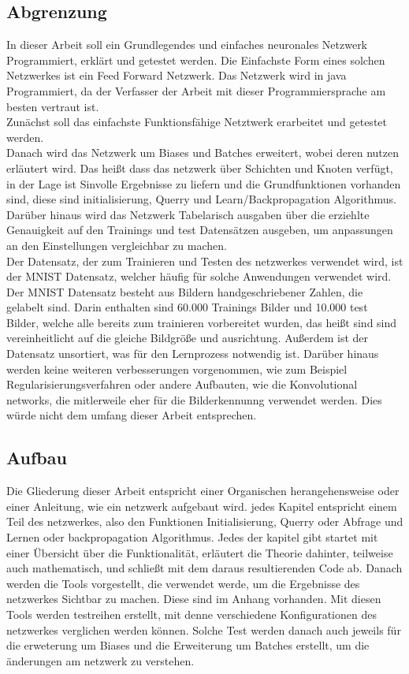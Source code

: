 \documentclass[12pt]{article}
\begin{document}
\subsection{ Abgrenzung}
In dieser Arbeit soll ein Grundlegendes und einfaches neuronales Netzwerk Programmiert, erklärt und getestet werden. Die Einfachste Form eines solchen Netzwerkes ist ein Feed Forward Netzwerk.  
Das Netzwerk wird in java Programmiert, da der Verfasser der Arbeit mit dieser Programmiersprache am besten vertraut ist.\\
Zunächst soll das einfachste Funktionsfähige Netztwerk erarbeitet und getestet werden.\\
Danach wird das Netzwerk um Biases und Batches erweitert, wobei deren nutzen erläutert wird. Das heißt dass das netzwerk über Schichten und Knoten verfügt, in der Lage ist Sinvolle Ergebnisse zu liefern und die Grundfunktionen vorhanden sind, diese sind initialisierung, Querry und Learn/Backpropagation Algorithmus. \\
Darüber hinaus wird das Netzwerk Tabelarisch ausgaben über die erziehlte Genauigkeit auf den Trainings und test Datensätzen ausgeben, um anpassungen an den Einstellungen vergleichbar zu machen.  \\
Der Datensatz, der zum Trainieren und Testen des netzwerkes verwendet wird, ist der MNIST Datensatz, welcher häufig für solche Anwendungen verwendet wird. Der MNIST Datensatz besteht aus Bildern handgeschriebener Zahlen, die gelabelt sind. Darin enthalten sind 60.000 Trainings Bilder und 10.000 test Bilder, welche alle bereits zum trainieren vorbereitet wurden, das heißt sind sind vereinheitlicht auf die gleiche Bildgröße und ausrichtung. Außerdem ist der Datensatz unsortiert, was für den Lernprozess notwendig ist.
Darüber hinaus werden keine weiteren verbesserungen vorgenommen, wie zum Beispiel Regularisierungsverfahren oder andere Aufbauten, wie die Konvolutional networks, die mitlerweile eher für die Bilderkennunng verwendet werden. Dies würde nicht dem umfang dieser Arbeit entsprechen.
\subsection{Aufbau}
Die Gliederung dieser Arbeit entspricht einer Organischen herangehensweise oder einer Anleitung, wie ein netzwerk aufgebaut wird. jedes Kapitel entspricht einem Teil des netzwerkes, also den Funktionen Initialisierung, Querry oder Abfrage und Lernen oder backpropagation Algorithmus. Jedes der kapitel gibt startet mit einer Übersicht über die Funktionalität, erläutert die Theorie dahinter, teilweise auch mathematisch, und schließt mit dem daraus resultierenden Code ab. 
Danach werden die Tools vorgestellt, die verwendet werde, um die Ergebnisse des netzwerkes Sichtbar zu machen. Diese sind im Anhang vorhanden. 
Mit diesen Tools werden testreihen erstellt, mit denne verschiedene Konfigurationen des netzwerkes verglichen werden können. Solche Test werden danach auch jeweils für die erweterung um Biases und die Erweiterung um Batches erstellt, um die änderungen am netzwerk zu verstehen.
\end{document}
